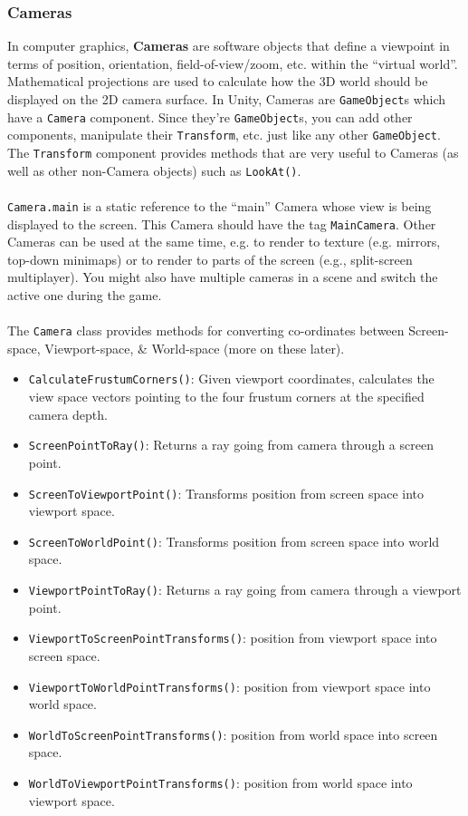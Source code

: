 \documentclass[a4paper,11pt]{article}
\begin{document}
\subsubsection{Cameras}
In computer graphics, \textbf{Cameras} are software objects that define a viewpoint in terms of position, orientation, 
field-of-view/zoom, etc. within the ``virtual world''.
Mathematical projections are used to calculate how the 3D world should be displayed on the 2D camera surface. 
In Unity, Cameras are \verb|GameObject|s which have a \verb|Camera| component. 
Since they're \verb|GameObject|s, you can add other components, manipulate their \verb|Transform|, etc. just like any other 
\verb|GameObject|. 
The \verb|Transform| component provides methods that are very useful to Cameras (as well as other non-Camera objects) such as 
\verb|LookAt()|. 
\\\\ 
\verb|Camera.main| is a static reference to the ``main'' Camera whose view is being displayed to the screen. 
This Camera should have the tag \verb|MainCamera|. 
Other Cameras can be used at the same time, e.g. to render to texture (e.g. mirrors, top-down minimaps) or to render to parts
of the screen (e.g., split-screen multiplayer).
You might also have multiple cameras in a scene and switch the active one during the game.
\\\\ 
The \verb|Camera| class provides methods for converting co-ordinates between Screen-space, Viewport-space, \& World-space 
(more on these later).
\begin{itemize}
    \item   \verb|CalculateFrustumCorners()|:  Given viewport coordinates, calculates the view space vectors pointing to the
            four frustum corners at the specified camera depth.
    \item   \verb|ScreenPointToRay()|:  Returns a ray going from camera through a screen point.
    \item   \verb|ScreenToViewportPoint()|:  Transforms position from screen space into viewport space.
    \item   \verb|ScreenToWorldPoint()|:  Transforms position from screen space into world space.
    \item   \verb|ViewportPointToRay()|: Returns a ray going from camera through a viewport point. 
    \item   \verb|ViewportToScreenPointTransforms()|: position from viewport space into screen space. 
    \item   \verb|ViewportToWorldPointTransforms()|: position from viewport space into world space. 
    \item   \verb|WorldToScreenPointTransforms()|: position from world space into screen space. 
    \item   \verb|WorldToViewportPointTransforms()|: position from world space into viewport space.
\end{itemize}
\end{document}
